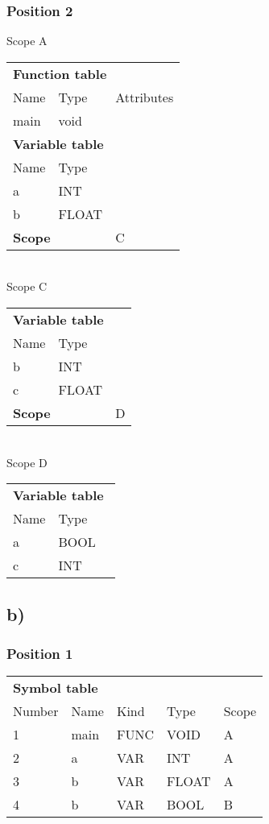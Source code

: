 \subsubsection*{Position 2}
Scope A \\
\begin{tabular}{|l l l|}
	\hline
	\multicolumn{3}{|l|}{\textbf{Function table}} \\
	Name & Type & Attributes	\\
	\hline
	main & void & 			\\
	\hline
	\multicolumn{3}{|l|}{\textbf{Variable table}} \\
	Name & Type &			\\
	\hline
	a & INT &			\\
	b & FLOAT &			\\
	\hline
	\multicolumn{2}{|l}{\textbf{Scope}} & C \\
	\hline
\end{tabular} \\
Scope C \\
\begin{tabular}{|l l l|}
	\hline
	\multicolumn{3}{|l|}{\textbf{Variable table}} \\
	Name & Type &			\\
	\hline
	b & INT &			\\
	c & FLOAT &			\\
	\hline
	\multicolumn{2}{|l}{\textbf{Scope}} & D \\
	\hline
\end{tabular} \\
Scope D \\
\begin{tabular}{|l l l|}
	\hline
	\multicolumn{3}{|l|}{\textbf{Variable table}} \\
	Name & Type &			\\
	\hline
	a & BOOL &			\\
	c & INT &			\\
	\hline
\end{tabular}

\subsection*{b)}
\subsubsection*{Position 1}
\begin{tabular}{|l l l l l|}
	\hline
	\multicolumn{5}{|l|}{\textbf{Symbol table}} \\
	Number & Name & Kind & Type & Scope	\\
	\hline
	1 & main & FUNC & VOID & A \\
	2 & a & VAR & INT & A \\
	3 & b & VAR & FLOAT & A \\
	4 & b & VAR & BOOL & B \\ 
	\hline
\end{tabular}

